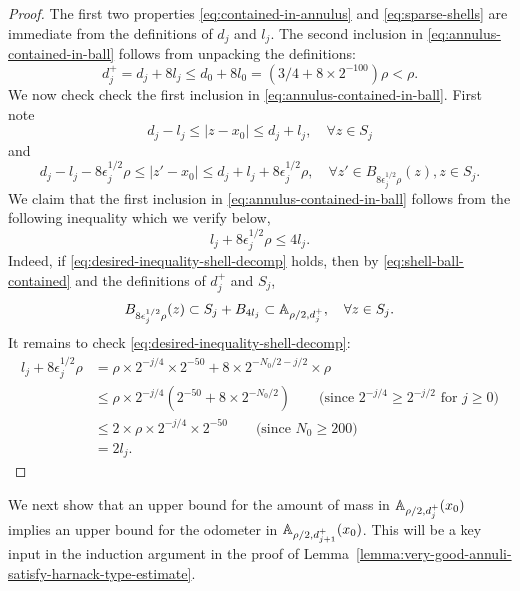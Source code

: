 \documentclass[12pt]{amsart}
\numberwithin{equation}{section}
\begin{document}
	\begin{proof}
		The first two properties \eqref{eq:contained-in-annulus} and \eqref{eq:sparse-shells} are immediate from the definitions of $d_j$ and $l_j$.
		The second inclusion in \eqref{eq:annulus-contained-in-ball} follows from unpacking the definitions:
		\[
		d^+_j = d_j + 8 l_j \leq d_0 + 8 l_0 =  (3/4 + 8 \times 2^{-100}) \rho < \rho.
		\]
		We now check check the first inclusion in \eqref{eq:annulus-contained-in-ball}. First note
		\begin{equation}
		d_j - l_j \leq |z - x_0| \leq d_j + l_j, \quad \forall z \in S_j
		\end{equation}
		and
		\begin{equation} \label{eq:shell-ball-contained}
		d_j - l_j - 8 \epsilon^{1/2}_j \rho \leq |z'-x_0| \leq d_j + l_j + 8 \epsilon^{1/2}_j \rho, \quad \forall z' \in B_{8 \epsilon^{1/2}_j \rho}(z), z \in S_j.
		\end{equation}
		We claim that the first inclusion in \eqref{eq:annulus-contained-in-ball} follows from the following inequality
		which we verify below,
		\begin{equation} \label{eq:desired-inequality-shell-decomp}
		l_j + 8 \epsilon^{1/2}_j \rho \leq 4 l_j.
		\end{equation}
		Indeed, if \eqref{eq:desired-inequality-shell-decomp} holds, then by \eqref{eq:shell-ball-contained}
		and the definitions of $d^+_j$ and $S_j$, 
		\[
		B_{8 \epsilon^{1/2}_j \rho}(z) \subset S_j + B_{4 l_j} \subset \mathbb{A}_{\rho/2, d^+_j}, \quad \forall z \in S_j.
		\]
		It remains to check \eqref{eq:desired-inequality-shell-decomp}: 
		\begin{align*}
		l_j + 8 \epsilon^{1/2}_j \rho &= \rho \times 2^{-j/4} \times 2^{-50} + 8 \times  2^{-N_0/2-j/2} \times \rho \\
		&\leq \rho \times 2^{-j/4} \left(  2^{-50} + 8 \times 2^{-N_0/2}  \right) \qquad \mbox{(since $2^{-j/4} \geq 2^{-j/2}$ for $j \geq 0$)} \\
		&\leq 2 \times \rho \times 2^{-j/4} \times 2^{-50} \qquad \mbox{(since $N_0 \geq 200$)} \\
		&= 2 l_j.
		\end{align*}
	\end{proof}
	
	We next show that an upper bound for the amount of mass in $\mathbb{A}_{\rho/2, d^+_j}(x_0)$ implies an upper bound for the odometer in $\mathbb{A}_{\rho/2, d^+_{j+1}}(x_0)$. This will be a key input in the induction argument in the proof of Lemma~\ref{lemma:very-good-annuli-satisfy-harnack-type-estimate}.
	
\end{document}
